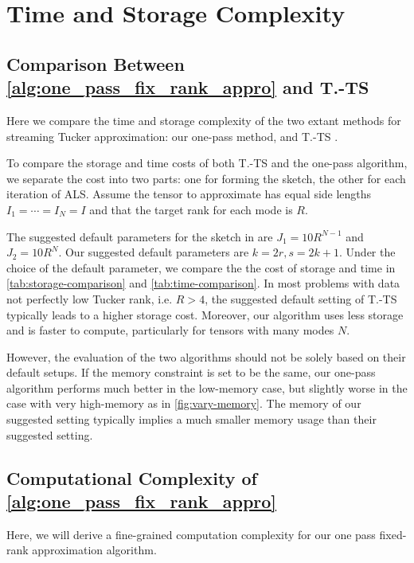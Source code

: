 \section{Time and Storage Complexity}\label{appendix: time-complexity}
\subsection{Comparison Between \cref{alg:one_pass_fix_rank_appro} and T.-TS \cite{malik2018low}}
Here we compare the time and storage complexity of the two extant methods for
streaming Tucker approximation: our one-pass method, and T.-TS \cite{malik2018low}.

To compare the storage and time costs of both T.-TS and the one-pass algorithm,
we separate the cost into two parts:
one for forming the sketch,
the other for each iteration of ALS.
Assume the tensor to approximate has equal side lengths $I_1=\cdots = I_N = I$
and that the target rank for each mode is $R$.

The suggested default parameters for the sketch in \cite{malik2018low}
are $J_1 = 10R^{N-1}$ and $J_2 = 10R^{N}$.
Our suggested default parameters are $k=2r, s=2k+1$. Under the choice of the default parameter, we compare the the cost of storage and time in \cref{tab:storage-comparison} and \cref{tab:time-comparison}. In most problems with data not perfectly low Tucker rank, i.e. $R > 4$, the suggested default setting of T.-TS typically leads to a higher storage cost. Moreover, our algorithm uses less storage and is faster to compute, particularly for tensors with many modes $N$.

However, the evaluation of the two algorithms should not be solely based on their default setups. If the memory constraint is set to be the same, our one-pass algorithm performs much better in the low-memory case, but slightly worse in the case with very high-memory as in \cref{fig:vary-memory}. The memory of our suggested setting typically implies a much smaller memory usage than their suggested setting.

\subsection{Computational Complexity of \cref{alg:one_pass_fix_rank_appro}}
Here, we will derive a fine-grained computation complexity for our one pass fixed-rank approximation algorithm.

